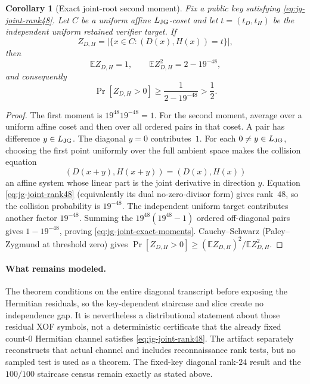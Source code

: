 \documentclass[11pt]{article}
\newtheorem{corollary}[theorem]{Corollary}
\begin{document}
\begin{corollary}[Exact joint-root second moment]
\label{cor:jg-joint-second-moment}
Fix a public key satisfying \eqref{eq:jg-joint-rank48}.  Let $C$ be a uniform
affine $L_{\rm JG}$-coset and let $t=(t_D,t_H)$ be the independent uniform
retained verifier target.  If
\[
 Z_{D,H}=|\{x\in C:(D(x),H(x))=t\}|,
\]
then
\begin{equation}
  \mathbb E Z_{D,H}=1,\qquad
  \mathbb E Z_{D,H}^2=2-19^{-48},
  \label{eq:jg-joint-exact-moments}
\end{equation}
and consequently
\begin{equation}
  \boxed{\Pr[Z_{D,H}>0]\ge\frac{1}{2-19^{-48}}>\frac12.}
  \label{eq:jg-joint-half-success}
\end{equation}
\end{corollary}

\begin{proof}
The first moment is $19^{48}19^{-48}=1$.  For the second moment, average over
a uniform affine coset and then over all ordered pairs in that coset.  A pair
has difference $y\in L_{\rm JG}$.  The diagonal $y=0$ contributes~$1$.  For
each $0\ne y\in L_{\rm JG}$, choosing the first point uniformly over the full
ambient space makes the collision equation
\[
 (D(x+y),H(x+y))=(D(x),H(x))
\]
an affine system whose linear part is the joint derivative in direction $y$.
Equation \eqref{eq:jg-joint-rank48} (equivalently its dual no-zero-divisor
form) gives rank~$48$, so the collision probability is $19^{-48}$.  The
independent uniform target contributes another factor $19^{-48}$.  Summing
the $19^{48}(19^{48}-1)$ ordered off-diagonal pairs gives
$1-19^{-48}$, proving \eqref{eq:jg-joint-exact-moments}.  Cauchy--Schwarz
(Paley--Zygmund at threshold zero) gives
$\Pr[Z_{D,H}>0]\ge(\mathbb EZ_{D,H})^2/\mathbb EZ_{D,H}^2$.
\end{proof}

\paragraph{What remains modeled.}
The theorem conditions on the entire diagonal transcript before exposing the
Hermitian residuals, so the key-dependent staircase and slice create no
independence gap.  It is nevertheless a distributional statement about those
residual XOF symbols, not a deterministic certificate that the already fixed
count-$0$ Hermitian channel satisfies \eqref{eq:jg-joint-rank48}.  The
artifact separately reconstructs that actual channel and includes
reconnaissance rank tests, but no sampled test is used as a theorem.  The
fixed-key diagonal rank-$24$ result and the $100/100$ staircase census remain
exactly as stated above.
\end{document}
